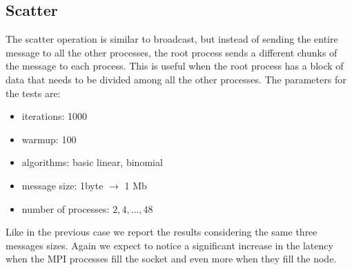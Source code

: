 
\subsection{Scatter}
    The scatter operation is similar to broadcast, but instead of sending
    the entire message to all the other processes, the root process
    sends a different chunks of the message to each process. This is useful
    when the root process has a block of data that needs to be divided
    among all the other processes.
    The parameters for the tests are:
    \begin{itemize}
        \item iterations: 1000
        \item warmup: 100
        \item algorithms: basic linear, binomial
        \item message size: 1byte $\rightarrow$ 1 Mb
        \item number of processes: $2, 4, \dots, 48$
    \end{itemize}
    Like in the previous case we report the results considering the same
    three messages sizes. Again we expect to notice a significant increase
    in the latency when the MPI processes fill the socket and even more
    when they fill the node.
